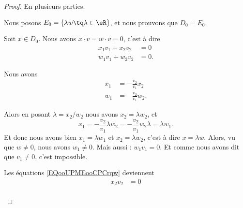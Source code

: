 \begin{proof}
	En plusieurs parties.
	\begin{subproof}
		Nous posons \( E_0=\{ \lambda w\tq \lambda\in \eR \}\), et nous prouvons que \( D_0=E_0\).
		\begin{subproof}
			\spitem[\( D_0\subset E_0\)]
			Soit \( x\in D_0\). Nous avons \( x\cdot v=w\cdot v=0\), c'est à dire
			\begin{subequations}		\label{EQooUPMEooCPCrqw}
				\begin{align}
					x_1v_1+x_2v_2 & =0   \\
					w_1v_1+w_2v_2 & = 0.
				\end{align}
			\end{subequations}
			\begin{subproof}
				\spitem[Si \( v_1\neq 0\)]
				Nous avons
				\begin{subequations}
					\begin{align}
						x_1 & =-\frac{ v_2 }{ v_1 }x_2  \\
						w_1 & =-\frac{ v_2 }{ v_1 }w_2.
					\end{align}
				\end{subequations}
				\begin{subproof}
					\spitem[Si \( w_2\neq 0\)]
					Alors en posant \( \lambda=x_2/w_2\) nous avons \( x_2=\lambda w_2\), et
					\begin{equation}
						x_1=-\frac{ v_2 }{ v_1 }\lambda w_2=-\frac{ v_2 }{ v_1 }w_2\lambda=\lambda w_1.
					\end{equation}
					Et donc nous avons bien \( x_1=\lambda w_1\) et \( x_2=\lambda w_2\), c'est à dire \( x=\lambda w\).
					\spitem[Si \( w_2= 0\)]
					Alors, vu que \( w\neq 0\), nous avons \( w_1\neq 0\). Mais aussi : \( w_1v_1=0\). Et comme nous avons dit que \( v_1\neq 0\), c'est impossible.
				\end{subproof}
				\spitem[Si \( v_1= 0\)]
				Les équations \eqref{EQooUPMEooCPCrqw} deviennent
				\begin{subequations}
					\begin{align}
						x_2v_2 & =0 \\

\end{align}
\end{subequations}
\end{subproof}
\end{subproof}
\end{subproof}
\end{proof}
